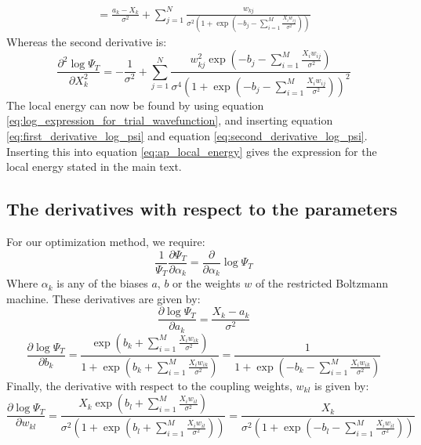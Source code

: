 \documentclass[a4paper, 10pt]{article}
\begin{document}
\begin{appendices}
\begin{equation}
\begin{split}
	=\frac{a_k-X_k}{\sigma^2}+\sum_{j=1}^N \frac{w_{kj}}{\sigma^2 \left(1+ \exp \left(-b_j-\sum_{i=1}^{M} \frac{X_iw_{ij}}{\sigma^2}\right)\right)}
	\end{split}
	\end{equation}
	Whereas the second derivative is:
	\begin{equation}\label{eq:second_derivative_log_psi}
	\frac{\partial^2 \log \Psi_T}{\partial X_k^2}=-\frac{1}{\sigma^2}+\sum_{j=1}^N \frac{w_{kj}^2 \exp \left(-b_j-\sum_{i=1}^{M}\frac{X_iw_{ij}}{\sigma^2} \right)}{\sigma^4\left(1+ \exp \left(-b_j-\sum_{i=1}^{M} \frac{X_iw_{ij}}{\sigma^2}\right)\right)^2}
	\end{equation}
	The local energy can now be found by using equation \ref{eq:log_expression_for_trial_wavefunction}, and inserting equation \ref{eq:first_derivative_log_psi} and equation \ref{eq:second_derivative_log_psi}. Inserting this into equation \ref{eq:ap_local_energy} gives the expression for the local energy stated in the main text.
	\subsection{The derivatives with respect to the parameters}\label{ap:derivative_parameters}
	For our optimization method, we require:
	\begin{equation}
	\frac{1}{\Psi_T}\frac{\partial \Psi_T}{\partial \alpha_k}=\frac{\partial }{\partial \alpha_k}\log \Psi_T
	\end{equation}
	Where $\alpha_k$ is any of the biases $a$, $b$ or the weights $w$ of the restricted Boltzmann machine. These derivatives are given by:
	\begin{equation}
	\frac{\partial \log \Psi_T }{\partial a_k}=\frac{X_k-a_k}{\sigma^2}
	\end{equation}
	\begin{equation}
	\frac{\partial \log \Psi_T}{\partial b_k}=\frac{\exp \left(b_k+\sum_{i=1}^M \frac{X_iw_{ik}}{\sigma^2}\right)}{1+\exp \left(b_k+\sum_{i=1}^M \frac{X_iw_{ik}}{\sigma^2}\right)}=\frac{1}{1+\exp \left(-b_k-\sum_{i=1}^M \frac{X_i w_{ik}}{\sigma^2}\right)}
	\end{equation}
	Finally, the derivative with respect to the coupling weights, $w_{kl}$ is given by:
	\begin{equation}
	\frac{\partial \log \Psi_T}{\partial w_{kl}}=\frac{X_k\exp\left(b_l+\sum_{i=1}^M \frac{X_iw_{il}}{\sigma^2}\right)}{\sigma^2\left(1+\exp \left( b_l + \sum_{i=1}^M \frac{X_iw_{il}}{\sigma^2}\right)\right)}=\frac{X_k}{\sigma^2\left(1+\exp \left(-b_l-\sum_{i=1}^M \frac{X_iw_{il}}{\sigma^2}\right)\right)}
	\end{equation}

\end{appendices}
\end{document}
